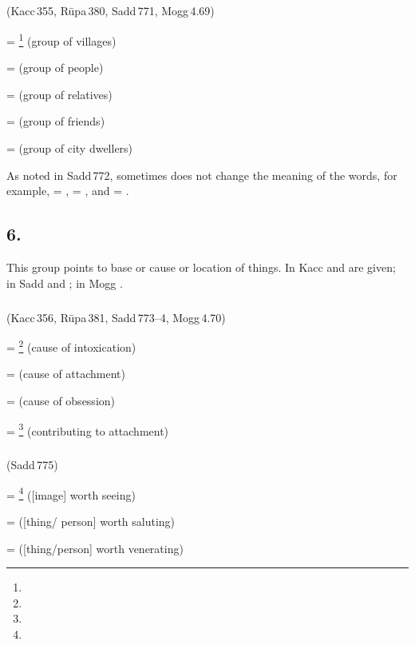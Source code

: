 \subparagraph*{} (Kacc\,355, R\=upa\,380, Sadd\,771, Mogg\,4.69)\label{pacct5:taa}

 = \footnote{} (group of villages) \par
{} =  (group of people) \par
{} =  (group of relatives) \par
{} =  (group of friends) \par
{} =  (group of city dwellers) \par

As noted in Sadd\,772, sometimes  does not change the meaning of the words, for example,  = ,  = , and  = .

\subsection*{6.\ }\label{tadgroup6}

This group points to base or cause or location of things. In Kacc  and  are given; in Sadd  and ; in Mogg .

\subparagraph*{} (Kacc\,356, R\=upa\,381, Sadd\,773--4, Mogg\,4.70)\label{pacct6:iya}

 = \footnote{} (cause of intoxication) \par
{} =  (cause of attachment) \par
{} =  (cause of obsession) \par
{} = \footnote{} (contributing to attachment) \par

\subparagraph*{} (Sadd\,775)\label{pacct6:iiya}\label{pacct6:eyya}

 = \footnote{} ([image] worth seeing) \par
{} =  ([thing/ person] worth saluting) \par
{} =  ([thing/person] worth venerating) \par

